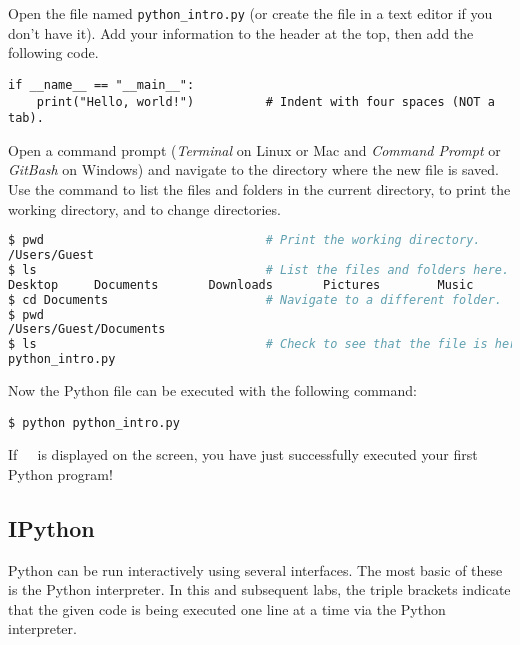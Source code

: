 \begin{problem} %
Open the file named \texttt{python\_intro.py} (or create the file in a text editor if you don't have it).
Add your information to the header at the top, then add the following code.

\begin{lstlisting}
if __name__ == "__main__":
    print("Hello, world!")          # Indent with four spaces (NOT a tab).
\end{lstlisting}

Open a command prompt (\emph{Terminal} on Linux or Mac and \emph{Command Prompt} or \emph{GitBash} on Windows) and navigate to the directory where the new file is saved.
Use the command  to list the files and folders in the current directory,  to print the working directory, and  to change directories.

\begin{lstlisting}[language=bash]
$ pwd                               # Print the working directory.
/Users/Guest
$ ls                                # List the files and folders here.
Desktop     Documents       Downloads       Pictures        Music
$ cd Documents                      # Navigate to a different folder.
$ pwd
/Users/Guest/Documents
$ ls                                # Check to see that the file is here.
python_intro.py
\end{lstlisting}

Now the Python file can be executed with the following command:

\begin{lstlisting}
$ python python_intro.py
\end{lstlisting}

If $\ $  $\ $ is displayed on the screen, you have just successfully executed your first Python program!
\label{prob:helloWorld}
\end{problem}

\subsection*{IPython} %

Python can be run interactively using several interfaces.
The most basic of these is the Python interpreter.
In this and subsequent labs, the triple brackets \li{>>>} indicate that the given code is being executed one line at a time via the Python interpreter.

